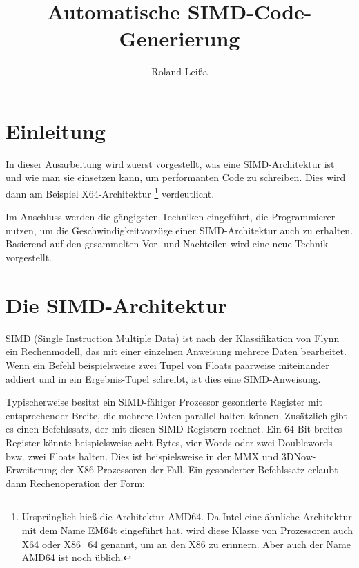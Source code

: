 \documentclass[a4paper,10pt]{article}
\title{Automatische SIMD-Code-Generierung}
\author{Roland Leißa}
\begin{document}
\thispagestyle{empty}

\maketitle
\thispagestyle{empty}
\newpage
\thispagestyle{empty}
\tableofcontents
\thispagestyle{empty}
\newpage
    \newpage
    \setcounter{page}{1}

\section{Einleitung}

In dieser Ausarbeitung wird zuerst vorgestellt, was eine SIMD-Architektur ist und wie man sie
einsetzen kann, um performanten Code zu schreiben. Dies wird dann am Beispiel X64-Architektur
\footnote{Ursprünglich hieß die Architektur AMD64. Da Intel eine ähnliche Architektur mit dem Name
EM64t eingeführt hat, wird diese Klasse von Prozessoren auch X64 oder X86\_64 genannt, um an den X86
zu erinnern. Aber auch der Name AMD64 ist noch üblich.} verdeutlicht.

Im Anschluss werden die gängigsten Techniken eingeführt, die Programmierer nutzen, um die
Geschwindigkeitvorzüge einer SIMD-Architektur auch zu erhalten. Basierend auf den gesammelten
Vor- und Nachteilen wird eine neue Technik vorgestellt.

\newpage

\section{Die SIMD-Architektur}

SIMD (Single Instruction Multiple Data) ist nach der Klassifikation von Flynn ein Rechenmodell, das
mit einer einzelnen Anweisung mehrere Daten bearbeitet. Wenn ein Befehl beispielsweise zwei Tupel
von Floats paarweise miteinander addiert und in ein Ergebnis-Tupel schreibt, ist dies eine
SIMD-Anweisung.

Typischerweise besitzt ein SIMD-fähiger Prozessor gesonderte Register mit entsprechender Breite, die
mehrere Daten parallel halten können. Zusätzlich gibt es einen Befehlssatz, der mit diesen
SIMD-Registern rechnet. Ein 64-Bit breites Register könnte beispielsweise acht Bytes, vier Words
oder zwei Doublewords bzw. zwei Floats halten. Dies ist beispielsweise in der MMX und
3DNow-Erweiterung der X86-Prozessoren der Fall. Ein gesonderter Befehlssatz erlaubt dann
Rechenoperation der Form:
\end{document}
